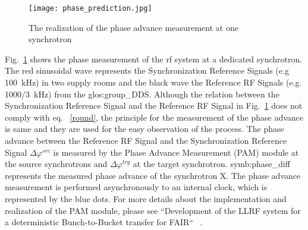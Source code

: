 \begin{figure}[!htb]
   \centering   
   \texttt{[image: phase\_prediction.jpg]}
   \caption{The realization of the phase advance measurement at one synchrotron}
   \label{phase_prediction}
\end{figure}

Fig.~\ref{phase_prediction} shows the phase measurement of the rf system at a dedicated synchrotron. The red sinusoidal wave represents the Synchronization Reference Signals (e.g \SI{100}{kHz}) in two supply rooms and the black wave the Reference RF Signals (e.g. \SI{1000/3}{kHz}) from the \gls{glos:group_DDS}. Although the relation between the Synchronization Reference Signal and the Reference RF Signal in Fig.~\ref{phase_prediction} does not comply with eq. ~\ref{round}, the principle for the measurement of the phase advance is same and they are used for the easy observation of the process. The phase advance  between the Reference RF Signal and the Synchronization Reference Signal $\Delta \varphi^\mathit{src}$ is measured by the Phase Advance Measurement (\gls{PAM}) module at the source synchrotrons and $\Delta \varphi^\mathit{trg}$ at the target synchrotron. \gls{symb:phase_diff} represents the measured phase advance of the synchrotron X. The phase advance measurement is performed asynchronously to an internal clock, which is represented by the blue dots. For more details about the implementation and realization of the PAM module, please see ``Development of the LLRF system for a deterministic Bunch-to-Bucket transfer for FAIR`` ~\cite{ferrand_development_????}. 
